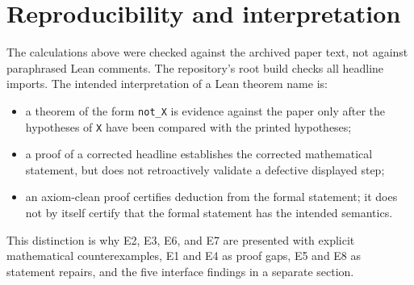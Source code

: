 \documentclass[11pt]{article}
\newcommand{\code}[1]{\nolinkurl{#1}}
\begin{document}
\section{Reproducibility and interpretation}

The calculations above were checked against the archived paper text, not
against paraphrased Lean comments.  The repository's root build checks all
headline imports.  The intended interpretation of a Lean theorem name is:
\begin{itemize}[leftmargin=2em]
\item a theorem of the form \code{not_X} is evidence against the paper only
  after the hypotheses of \code{X} have been compared with the printed
  hypotheses;
\item a proof of a corrected headline establishes the corrected mathematical
  statement, but does not retroactively validate a defective displayed step;
\item an axiom-clean proof certifies deduction from the formal statement; it
  does not by itself certify that the formal statement has the intended
  semantics.
\end{itemize}

\noindent This distinction is why E2, E3, E6, and E7 are presented with
explicit mathematical counterexamples, E1 and E4 as proof gaps, E5 and E8 as
statement repairs, and the five interface findings in a separate section.
\end{document}
